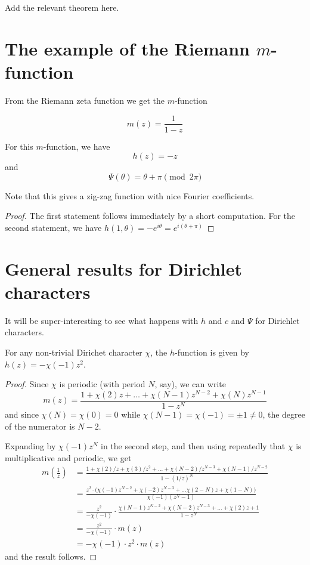 \documentclass[a4paper]{amsart}
\begin{document}
Add the relevant theorem here.

\section{The example of the Riemann $m$-function}

From the Riemann zeta function we get the $m$-function

$$ m(z) = \frac{1}{1-z}   $$

\begin{lemma}
For this $m$-function, we have
$$h(z) = -z$$
and
$$\Psi(\theta ) = \theta + \pi \pmod {2\pi}$$

\end{lemma}
Note that this gives a zig-zag function with nice Fourier coefficients.

\begin{proof}
The first statement follows immediately by a short computation. For the second statement, we have $h(1, \theta) = -e^{i \theta} = e^{i (\theta + \pi)} $
\end{proof}

\section{General results for Dirichlet characters}

It will be super-interesting to see what happens with $h$ and $c$ and $\Psi$ for Dirichlet characters.

\begin{proposition}
For any non-trivial Dirichet character $\chi$, the $h$-function is given by $h(z) = -\chi(-1) z^2$.
\end{proposition}
\begin{proof}
Since $\chi$ is periodic (with period $N$, say), we can write
$$ m(z) = \frac{1 + \chi(2) z + \ldots + \chi(N-1) z^{N-2} + \chi(N) z^{N-1}}{1-z^N} $$
and since $\chi(N) = \chi(0) = 0$ while $\chi(N-1)= \chi(-1) = \pm 1 \neq 0$, the degree of the numerator is $N-2$.

Expanding by $\chi(-1) z^N $ in the second step, and then using repeatedly that $\chi$ is multiplicative and periodic, we get
\begin{align*}
    m(\frac{1}{z}) &= \frac{1+\chi(2)/z + \chi(3) / z^2 + \ldots + \chi(N-2) / z^{N-3} + \chi(N-1) /z^{N-2} }{1-(1/z)^N}  \\
        &= \frac{z^2 \cdot \big( \chi(-1)z^{N-2} + \chi(-2) z^{N-3} + \ldots \chi(2-N) z + \chi(1-N) \big)}{\chi(-1) (z^N - 1 )} \\
        &= \frac{z^2}{- \chi(-1)} \cdot \frac{ \chi(N-1) z^{N-2} + \chi(N-2) z^{N-3} + \ldots + \chi(2) z + 1}{1-z^N} \\
        &= \frac{z^2}{-\chi(-1)} \cdot m(z) \\
        &= -\chi(-1) \cdot z^2 \cdot m(z)
\end{align*}
and the result follows.
\end{proof}
\end{document}
